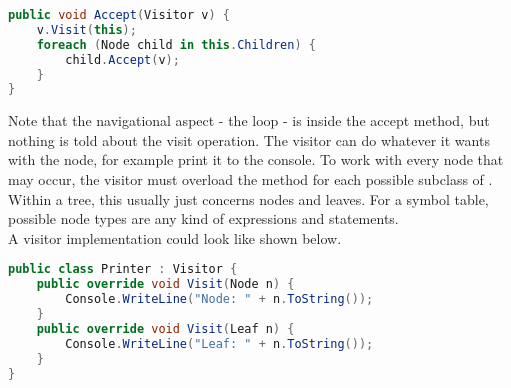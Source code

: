 \begin{lstlisting}[language=csharp, caption={Example for Accept}, captionpos=b, label={lst:accept}]
public void Accept(Visitor v) {
    v.Visit(this);
    foreach (Node child in this.Children) {
        child.Accept(v);
    }
}
\end{lstlisting}

Note that the navigational aspect - the  loop - is inside the accept method, but nothing is told about the visit operation.
The visitor can do whatever it wants with the node, for example print it to the console.
To work with every node that may occur, the visitor must overload the  method for each possible subclass of .
Within a tree, this usually just concerns nodes and leaves.
For a symbol table, possible node types are any kind of expressions and statements.\\

A visitor implementation could look like shown below.

\begin{lstlisting}[language=csharp, caption={Example for Visitor}, captionpos=b, label={lst:visitor}]
public class Printer : Visitor {
    public override void Visit(Node n) {
        Console.WriteLine("Node: " + n.ToString());
    }
    public override void Visit(Leaf n) {
        Console.WriteLine("Leaf: " + n.ToString());
    }
}
\end{lstlisting}

